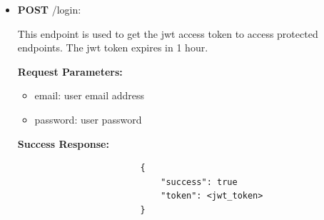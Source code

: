 \documentclass[12pt]{article}
\begin{document}
\begin{itemize}
             \item \textbf{POST} /login:
                \begin{addmargin}[1em]{2em}%
                    This endpoint is used to get the jwt access token to access protected endpoints. The jwt token expires in 1 hour.
                    \par\textbf{Request Parameters:}
                    \begin{itemize}
                        \item email: user email address
                        \item password: user password
                    \end{itemize}
                    \par\textbf{Success Response:}
                    \begin{listing}[H]
                    \begin{verbatim}
                        {     
                            "success": true
                            "token": <jwt_token>
                        }
                    \end{verbatim}
                    \end{listing}
                \end{addmargin}


\end{itemize}
\end{document}
